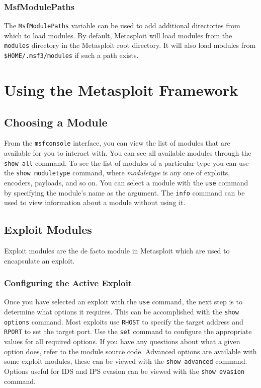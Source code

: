 \documentclass{report}
\begin{document}
	\subsection{MsfModulePaths}

\par
The \texttt{MsfModulePaths} variable can be used to add additional directories
from which to load modules. By default, Metasploit will load modules from the
\texttt{modules} directory in the Metasploit root directory. It will also load
modules from \texttt{\$HOME/.msf3/modules} if such a path exists.

\pagebreak

\chapter{Using the Metasploit Framework}

	\section{Choosing a Module}

\par
From the \texttt{msfconsole} interface, you can view the list of modules that
are available for you to interact with. You can see all available modules
through the \texttt{show all} command. To see the list of modules of a
particular type you can use the \texttt{show moduletype} command, where
\textit{moduletype} is any one of exploits, encoders, payloads, and so on. You
can select a module with the \texttt{use} command by specifying the module's
name as the argument. The \texttt{info} command can be used to view information
about a module without using it.

	\section{Exploit Modules}

\par
Exploit modules are the de facto module in Metasploit which are used to
encapsulate an exploit.

		\subsection{Configuring the Active Exploit}

\par
Once you have selected an exploit with the \texttt{use} command, the next step
is to determine what options it requires. This can be accomplished with the
\texttt{show options} command. Most exploits use \texttt{RHOST} to specify the
target address and \texttt{RPORT} to set the target port. Use the \texttt{set}
command to configure the appropriate values for all required options. If you
have any questions about what a given option does, refer to the module source
code. Advanced options are available with some exploit modules, these can be
viewed with the \texttt{show advanced} command. Options useful for IDS and IPS
evasion can be viewed with the \texttt{show evasion} command.
\end{document}
